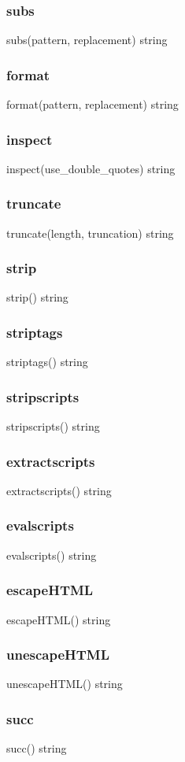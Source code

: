 {{{{{{{{\subsubsection*{subs}
subs(pattern, replacement) \rightarrow string
\subsubsection*{format}
format(pattern, replacement) \rightarrow string
\subsubsection*{inspect} 
inspect(use_double_quotes) \rightarrow string
\subsubsection*{truncate}
truncate(length, truncation) \rightarrow string
\subsubsection*{strip}
strip() \rightarrow string
\subsubsection*{striptags}
striptags() \rightarrow string
\subsubsection*{stripscripts}
stripscripts() \rightarrow string
\subsubsection*{extractscripts}
extractscripts() \rightarrow string
\subsubsection*{evalscripts}
evalscripts() \rightarrow string
\subsubsection*{escapeHTML}
escapeHTML() \rightarrow string
\subsubsection*{unescapeHTML}
unescapeHTML() \rightarrow string
\subsubsection*{succ}
succ() \rightarrow string
}}}}}}}}
